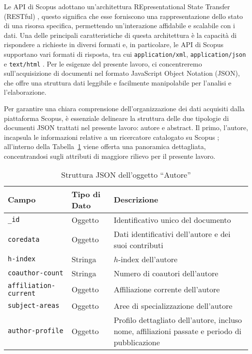 Le API di Scopus adottano un'architettura REpresentational State Transfer (RESTful) \cite{scopus-api-description}, questo significa che esse forniscono una rappresentazione dello stato di una risorsa specifica, permettendo un'interazione affidabile e scalabile con i dati. Una delle principali caratteristiche di questa architettura è la capacità di rispondere a richieste in diversi formati e, in particolare, le API di Scopus supportano vari formati di risposta, tra cui \texttt{application/xml}, \texttt{application/json} e \texttt{text/html} \cite{scopus-api-specs}. Per le esigenze del presente lavoro, ci concentreremo sull'acquisizione di documenti nel formato JavaScript Object Notation (JSON), che offre una struttura dati leggibile e facilmente manipolabile per l'analisi e l'elaborazione.

Per garantire una chiara comprensione dell'organizzazione dei dati acquisiti dalla piattaforma Scopus, è essenziale delineare la struttura delle due tipologie di documenti JSON trattati nel presente lavoro: autore e abstract.
Il primo, l'autore, incapsula le informazioni relative a un ricercatore catalogato su Scopus \cite{author-scopus}; all'interno della Tabella~\ref{tab:json_structure_author} viene offerta una panoramica dettagliata, concentrandosi sugli attributi di maggiore rilievo per il presente lavoro.
\begin{table}[ht]
    \centering
    \begin{tabularx}{\textwidth}{|l|l|X|}
        \hline
        \textbf{Campo} & \textbf{Tipo di Dato} & \textbf{Descrizione} \\
        \hline
        \texttt{\_id} & Oggetto & Identificativo unico del documento \\
        \hline
        \texttt{coredata} & Oggetto & Dati identificativi dell'autore e dei suoi contributi \\
        \hline
        \texttt{h-index} & Stringa & $h$-index dell'autore \\
        \hline
        \texttt{coauthor-count} & Stringa & Numero di coautori dell'autore \\
        \hline
        \texttt{affiliation-current} & Oggetto & Affiliazione corrente dell'autore \\
        \hline
        \texttt{subject-areas} & Oggetto & Aree di specializzazione dell'autore \\
        \hline
        \texttt{author-profile} & Oggetto & Profilo dettagliato dell'autore, incluso nome, affiliazioni passate e periodo di pubblicazione  \\
        \hline
    \end{tabularx}
    \caption{Struttura JSON dell'oggetto ``Autore''}
    \label{tab:json_structure_author}
\end{table}

